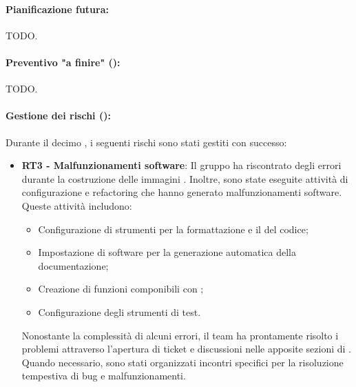 \paragraph*{Pianificazione futura:}
\par TODO.

\paragraph*{Preventivo "a finire" ():}
\par TODO.

\paragraph*{Gestione dei rischi ():}
\par Durante il decimo , i seguenti rischi sono stati gestiti con successo:
\begin{itemize}
  \item \textbf{RT3 - Malfunzionamenti software}: Il gruppo ha riscontrato degli errori durante la costruzione delle immagini . Inoltre, sono state eseguite attività di configurazione e refactoring che hanno generato malfunzionamenti software. Queste attività includono:
  \begin{itemize}
    \item Configurazione di strumenti per la formattazione e il  del codice;
    \item Impostazione di software per la generazione automatica della documentazione;
    \item Creazione di funzioni componibili con ;
    \item Configurazione degli strumenti di test.
  \end{itemize}
  Nonostante la complessità di alcuni errori, il team ha prontamente risolto i problemi attraverso l'apertura di ticket e discussioni nelle apposite sezioni di . Quando necessario, sono stati organizzati incontri specifici per la risoluzione tempestiva di bug e malfunzionamenti.
\end{itemize}